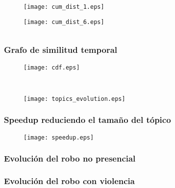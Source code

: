 \documentclass[
	spanish, %
	aspectratio=43, %
	hyperref={pdfencoding=auto,psdextra},
	xcolor={dvipsnames,table,usenames},
]{beamer}
\begin{document}
\begin{frame}[t]
\begin{columns}[t]
\begin{column}{0.5\textwidth}
\begin{figure}
    \texttt{[image: cum\_dist\_1.eps]}
\end{figure}

\begin{figure}
\texttt{[image: cum\_dist\_6.eps]}
\end{figure}
\end{column}
\end{columns}
\end{frame}

\begin{frame}
\frametitle{Grafo de similitud temporal}
\begin{figure}
\texttt{[image: cdf.eps]}
\end{figure}

\begin{figure}
\\
\end{figure}

\begin{figure}
\texttt{[image: topics\_evolution.eps]}
\end{figure}

\end{frame}

\begin{frame}
\frametitle{Speedup reduciendo el tamaño del tópico}

\begin{figure}
\texttt{[image: speedup.eps]}
\end{figure}
\end{frame}

\begin{frame}
\frametitle{Evolución del robo no presencial}
\end{frame}

\begin{frame}
\frametitle{Evolución del robo con violencia}
\end{frame}
\end{document}
